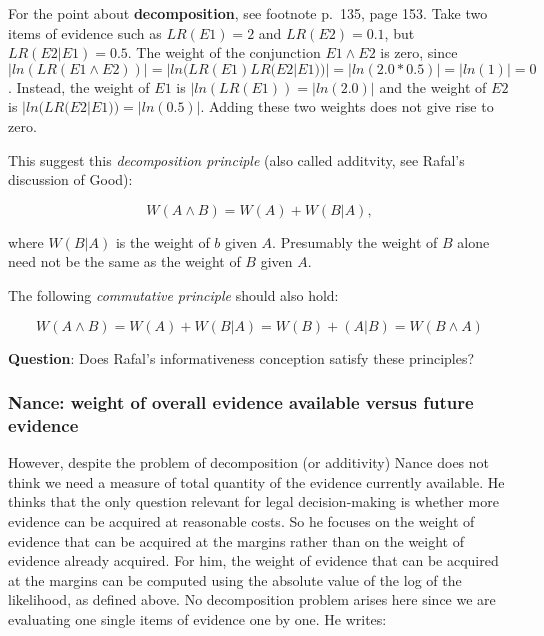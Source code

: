 \documentclass[
  10pt,
  dvipsnames,enabledeprecatedfontcommands]{scrartcl}
\begin{document}
For the point about \textbf{decomposition}, see footnote p.~135, page
153. Take two items of evidence such as \(LR(E1)=2\) and \(LR(E2)=0.1\),
but \(LR(E2 | E1)=0.5\). The weight of the conjunction \(E1 \wedge E2\)
is zero, since
\(|ln(LR(E1 \wedge E2))|=|ln(LR(E1)LR(E2| E1))|=|ln(2.0*0.5)|=|ln(1)|=0\).
Instead, the weight of \(E1\) is \(|ln(LR(E1))=|ln(2.0)|\) and the
weight of \(E2\) is \(|ln(LR(E2|E1))=|ln(0.5)|\). Adding these two
weights does not give rise to zero.


This suggest this \textit{decomposition principle} (also called
additvity, see Rafal's discussion of Good):

\[W(A \wedge B) = W(A) + W(B | A),\]

where \(W(B | A)\) is the weight of \(b\) given \(A\). Presumably the
weight of \(B\) alone need not be the same as the weight of \(B\) given
\(A\).

The following \textit{commutative principle} should also hold:

\[W(A \wedge B) = W(A) + W(B | A)= W(B) + (A | B) = W(B \wedge A)\]

\textbf{Question}: Does Rafal's informativeness conception satisfy these
principles?


\hypertarget{nance-weight-of-overall-evidence-available-versus-future-evidence}{%
\subsubsection{Nance: weight of overall evidence available versus future
evidence}\label{nance-weight-of-overall-evidence-available-versus-future-evidence}}

However, despite the problem of decomposition (or additivity) Nance does
not think we need a measure of total quantity of the evidence currently
available. He thinks that the only question relevant for legal
decision-making is whether more evidence can be acquired at reasonable
costs. So he focuses on the weight of evidence that can be acquired at
the margins rather than on the weight of evidence already acquired. For
him, the weight of evidence that can be acquired at the margins can be
computed using the absolute value of the log of the likelihood, as
defined above. No decomposition problem arises here since we are
evaluating one single items of evidence one by one. He writes:
\end{document}

